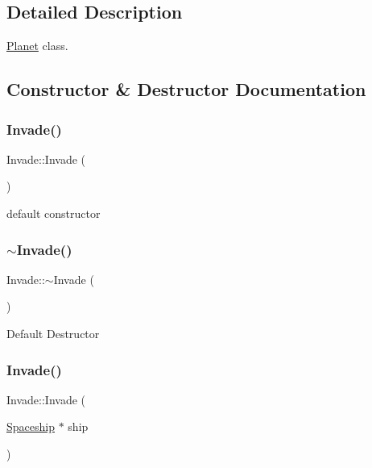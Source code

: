 \subsection{Detailed Description}
\hyperlink{classPlanet}{Planet} class. 

\subsection{Constructor \& Destructor Documentation}
\mbox{\label{classInvade_a7abfb047bd3df1e5d44a0c65701b58bd}} 
\subsubsection{\texorpdfstring{Invade()}{Invade()}\hspace{0.1cm}{\footnotesize\ttfamily [1/2]}}
{\footnotesize\ttfamily Invade\+::\+Invade (\begin{DoxyParamCaption}{ }\end{DoxyParamCaption})}

default constructor \mbox{\label{classInvade_a54e5cbe56b8748809beda7d798546103}} 
\subsubsection{\texorpdfstring{$\sim$\+Invade()}{~Invade()}}
{\footnotesize\ttfamily Invade\+::$\sim$\+Invade (\begin{DoxyParamCaption}{ }\end{DoxyParamCaption})}

Default Destructor \mbox{\label{classInvade_a5fdc8e1f96494355363666c6ef5a4fac}} 
\subsubsection{\texorpdfstring{Invade()}{Invade()}\hspace{0.1cm}{\footnotesize\ttfamily [2/2]}}
{\footnotesize\ttfamily Invade\+::\+Invade (\begin{DoxyParamCaption}\item[{\hyperlink{classSpaceship}{Spaceship} $\ast$}]{ship }\end{DoxyParamCaption})\hspace{0.3cm}{\ttfamily [inline]}}

